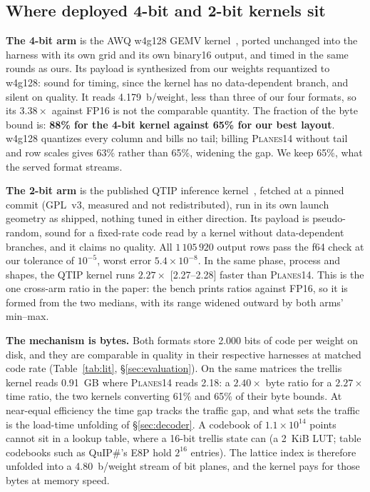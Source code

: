 \subsection{Where deployed 4-bit and 2-bit kernels sit}
\label{sec:qtip}

\textbf{The 4-bit arm} is the AWQ w4g128 GEMV kernel~\citep{awq2024},
ported unchanged into the harness with its own grid and its own binary16
output, and timed in the same rounds as ours. Its payload is synthesized
from our weights requantized to w4g128: sound for timing, since the kernel
has no data-dependent branch, and silent on quality. It reads
4.179~b/weight, less than three of our four formats, so its $3.38\times$
against FP16 is not the comparable quantity. The fraction of the byte bound
is: \textbf{88\% for the 4-bit kernel against 65\% for our best layout}.
w4g128 quantizes every column and bills no tail; billing \textsc{Planes14}
without tail and row scales gives 63\% rather than 65\%, widening the gap.
We keep 65\%, what the served format streams.

\textbf{The 2-bit arm} is the published QTIP inference
kernel~\citep{qtip2024}, fetched at a pinned commit (GPL~v3, measured and
not redistributed), run in its own launch geometry as shipped, nothing
tuned in either direction. Its payload is pseudo-random, sound for a
fixed-rate code read by a kernel without data-dependent branches, and it
claims no quality. All $1\,105\,920$ output rows pass the f64 check at our
tolerance of $10^{-5}$, worst error $5.4\times10^{-8}$. In the same phase,
process and shapes, the QTIP kernel runs $\mathbf{2.27\times}$ [2.27--2.28]
faster than \textsc{Planes14}. This is the one cross-arm ratio in the
paper: the bench prints ratios against FP16, so it is formed from the two
medians, with its range widened outward by both arms' min--max.

\textbf{The mechanism is bytes.} Both formats store 2.000 bits of code per
weight on disk, and they are comparable in quality in their respective harnesses at matched code rate
(Table~\ref{tab:lit}, \S\ref{sec:evaluation}). On the same matrices the
trellis kernel reads 0.91~GB where \textsc{Planes14} reads 2.18: a
$2.40\times$ byte ratio for a $2.27\times$ time ratio, the two kernels
converting 61\% and 65\% of their byte bounds. At near-equal efficiency
the time gap tracks the traffic gap, and what sets the traffic is the
load-time unfolding of \S\ref{sec:decoder}. A codebook
of $1.1\times10^{14}$ points cannot sit in a lookup table, where a 16-bit
trellis state can (a 2~KiB LUT; table codebooks such as QuIP\#'s E8P hold
$2^{16}$ entries). The lattice index is therefore unfolded into a
4.80~b/weight stream of bit planes, and the kernel pays for those bytes at
memory speed.

